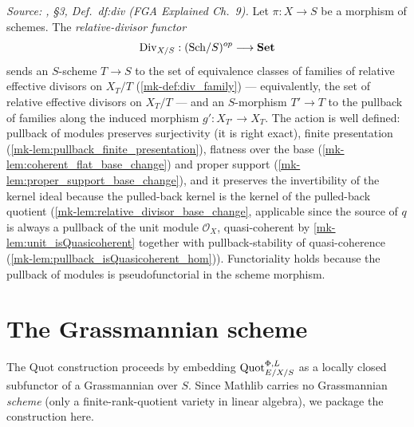 \begin{definition}\label{mk-def:div_functor}
  \leanok

  \textit{Source: \cite{kleiman-picard}, \S 3, Def.~df:div (FGA Explained Ch.~9).}
  Let \(\pi : X \to S\) be a morphism of schemes.  The
  \emph{relative-divisor functor}
  \[
    \operatorname{Div}_{X/S} : (\mathrm{Sch}/S)^{op} \longrightarrow \mathbf{Set}
  \]
  sends an \(S\)-scheme \(T \to S\) to the set of equivalence classes of
  families of relative effective divisors on \(X_T/T\)
  (\ref{mk-def:div_family}) --- equivalently, the set of relative effective
  divisors on \(X_T/T\) --- and an \(S\)-morphism \(T' \to T\) to the
  pullback of families along the induced morphism
  \(g' : X_{T'} \to X_T\).  The action is well defined: pullback of modules
  preserves surjectivity (it is right exact), finite presentation
  (\ref{mk-lem:pullback_finite_presentation}), flatness over the base
  (\ref{mk-lem:coherent_flat_base_change}) and proper support
  (\ref{mk-lem:proper_support_base_change}), and it preserves the
  invertibility of the kernel ideal because the pulled-back kernel is the
  kernel of the pulled-back quotient (\ref{mk-lem:relative_divisor_base_change},
  applicable since the source of \(q\) is always a pullback of the unit
  module \(\mathcal O_X\), quasi-coherent by \ref{mk-lem:unit_isQuasicoherent}
  together with pullback-stability of quasi-coherence
  (\ref{mk-lem:pullback_isQuasicoherent_hom})).  Functoriality holds because
  the pullback of modules is pseudofunctorial in the scheme morphism.
\end{definition}

\section{The Grassmannian scheme}
\label{mk-sec:grassmannian_scheme}

The Quot construction proceeds by embedding \(\operatorname{Quot}^{\Phi,L}_{E/X/S}\) as a
locally closed subfunctor of a Grassmannian over \(S\). Since Mathlib carries
no Grassmannian \emph{scheme} (only a finite-rank-quotient variety in
linear algebra), we package the construction here.

